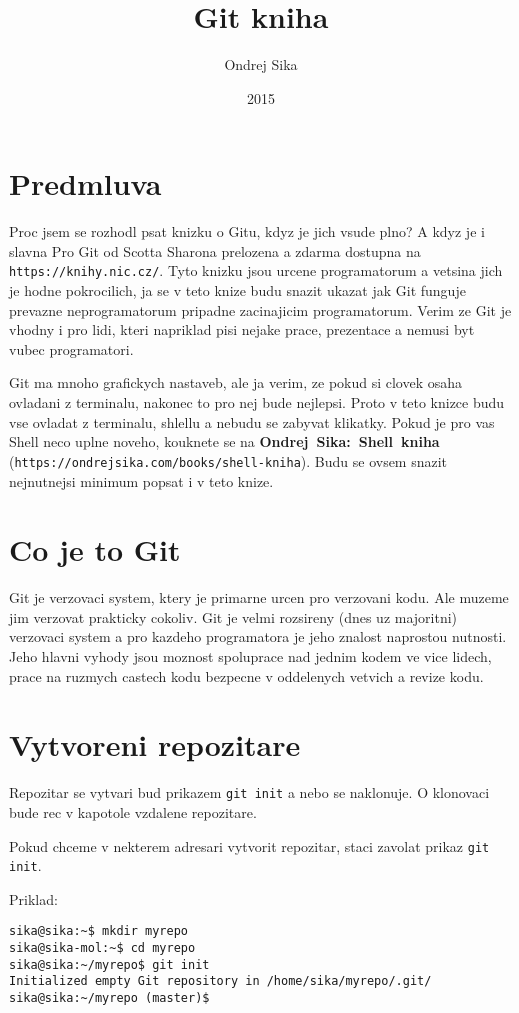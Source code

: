\documentclass[12pt,a5paper]{article}
\title{Git kniha}
\author{Ondrej Sika}
\date{2015}
\begin{document}


\section{Predmluva}

Proc jsem se rozhodl psat knizku o Gitu, kdyz je jich vsude plno? A kdyz je i slavna Pro Git od Scotta Sharona prelozena a zdarma dostupna na \lstinline|https://knihy.nic.cz/|. Tyto knizku jsou urcene programatorum a vetsina jich je hodne pokrocilich, ja se v teto knize budu snazit ukazat jak Git funguje prevazne neprogramatorum pripadne zacinajicim programatorum. Verim ze Git je vhodny i pro lidi, kteri napriklad pisi nejake prace, prezentace a nemusi byt vubec programatori.

Git ma mnoho grafickych nastaveb, ale ja verim, ze pokud si clovek osaha ovladani z terminalu, nakonec to pro nej bude nejlepsi. Proto v teto knizce budu vse ovladat z terminalu, shlellu a nebudu se zabyvat klikatky. Pokud je pro vas Shell neco uplne noveho, kouknete se na {\bf Ondrej~Sika:~Shell~kniha} (\lstinline|https://ondrejsika.com/books/shell-kniha|). Budu se ovsem snazit nejnutnejsi minimum popsat i v teto knize.

\section{Co je to Git}

Git je verzovaci system, ktery je primarne urcen pro verzovani kodu. Ale muzeme jim verzovat prakticky cokoliv. Git je velmi rozsireny (dnes uz majoritni) verzovaci system a pro kazdeho programatora je jeho znalost naprostou nutnosti. Jeho hlavni vyhody jsou moznost spoluprace nad jednim kodem ve vice lidech, prace na ruzmych castech kodu bezpecne v oddelenych vetvich a revize kodu.

\section{Vytvoreni repozitare}

Repozitar se vytvari bud prikazem \lstinline|git init| a nebo se naklonuje. O klonovaci bude rec v kapotole vzdalene repozitare.

Pokud chceme v nekterem adresari vytvorit repozitar, staci zavolat prikaz \lstinline|git init|.

Priklad:

\begin{lstlisting}
sika@sika:~$ mkdir myrepo
sika@sika-mol:~$ cd myrepo
sika@sika:~/myrepo$ git init
Initialized empty Git repository in /home/sika/myrepo/.git/
sika@sika:~/myrepo (master)$
\end{lstlisting}
\end{document}

